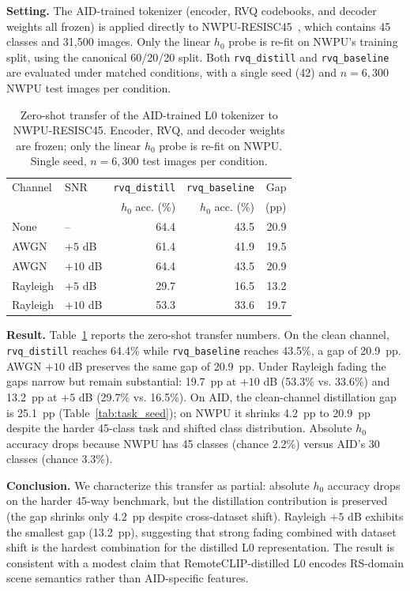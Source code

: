 \documentclass[lettersize,journal]{IEEEtran}
\begin{document}
\textbf{Setting.} The AID-trained tokenizer (encoder, RVQ codebooks, and decoder weights all frozen) is applied directly to NWPU-RESISC45~\cite{cheng2017nwpu}, which contains 45 classes and 31{,}500 images. Only the linear $h_0$ probe is re-fit on NWPU's training split, using the canonical 60/20/20 split. Both \texttt{rvq\_distill} and \texttt{rvq\_baseline} are evaluated under matched conditions, with a single seed (42) and $n=6{,}300$ NWPU test images per condition.

\begin{table}[!t]
\centering
\caption{Zero-shot transfer of the AID-trained L0 tokenizer to NWPU-RESISC45. Encoder, RVQ, and decoder weights are frozen; only the linear $h_0$ probe is re-fit on NWPU. Single seed, $n=6{,}300$ test images per condition.}
\label{tab:nwpu_zeroshot}
\begin{tabular}{@{}llrrr@{}}
\toprule
Channel & SNR & \texttt{rvq\_distill} & \texttt{rvq\_baseline} & Gap \\
        &     & $h_0$ acc. (\%)        & $h_0$ acc. (\%)         & (pp)  \\
\midrule
None     & --        & 64.4 & 43.5 & 20.9 \\
AWGN     & $+5$ dB   & 61.4 & 41.9 & 19.5 \\
AWGN     & $+10$ dB  & 64.4 & 43.5 & 20.9 \\
Rayleigh & $+5$ dB   & 29.7 & 16.5 & 13.2 \\
Rayleigh & $+10$ dB  & 53.3 & 33.6 & 19.7 \\
\bottomrule
\end{tabular}
\end{table}

\textbf{Result.} Table~\ref{tab:nwpu_zeroshot} reports the zero-shot transfer numbers. On the clean channel, \texttt{rvq\_distill} reaches 64.4\% while \texttt{rvq\_baseline} reaches 43.5\%, a gap of 20.9~pp. AWGN $+10$ dB preserves the same gap of 20.9~pp. Under Rayleigh fading the gaps narrow but remain substantial: 19.7~pp at $+10$ dB (53.3\% vs. 33.6\%) and 13.2~pp at $+5$ dB (29.7\% vs. 16.5\%). On AID, the clean-channel distillation gap is 25.1~pp (Table~\ref{tab:task_seed}); on NWPU it shrinks 4.2~pp to 20.9~pp despite the harder 45-class task and shifted class distribution. Absolute $h_0$ accuracy drops because NWPU has 45 classes (chance 2.2\%) versus AID's 30 classes (chance 3.3\%).

\textbf{Conclusion.} We characterize this transfer as partial: absolute $h_0$ accuracy drops on the harder 45-way benchmark, but the distillation contribution is preserved (the gap shrinks only 4.2~pp despite cross-dataset shift). Rayleigh $+5$ dB exhibits the smallest gap (13.2~pp), suggesting that strong fading combined with dataset shift is the hardest combination for the distilled L0 representation. The result is consistent with a modest claim that RemoteCLIP-distilled L0 encodes RS-domain scene semantics rather than AID-specific features.
\end{document}
